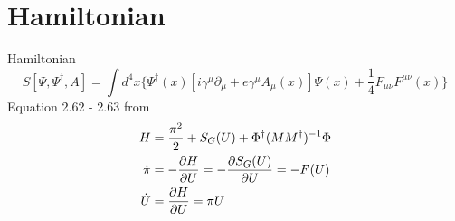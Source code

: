 \documentclass[10pt]{beamer}
\begin{document}
\section{Hamiltonian}
\begin{frame}{Hamiltonian}
    \begin{equation}
        S[\Psi,\Psi^{\dagger},A] = \int{d^4x \{\Psi^\dagger(x)\left[i\gamma^\mu\partial_\mu + e\gamma^\mu A_\mu(x) \right]\Psi(x) +\frac{1}{4} F_{\mu\nu}F^{\mu\nu}(x) \}} 
    \end{equation}
   Equation 2.62 - 2.63 from~\cite{luscher2010computational}
    \begin{align}
        H &= \frac{\pi^2}{2} + S_G(U) + \Phi^\dagger (MM^\dagger)^{-1}\Phi \\
        \dot\pi & = - \diffp{H}{U}= - \diffp{S_G(U)}{U} = -F(U)\\
        \dot U &= \diffp{H}{U} = \pi U
    \end{align}
\end{frame}
   
\end{document}
